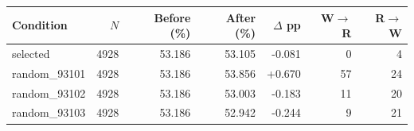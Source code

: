 \begin{tabular}{lrrrrrr}
\hline
Condition & $N$ & Before (\%) & After (\%) & $\Delta$ pp & W$\to$R & R$\to$W \\
\hline
selected & 4928 & 53.186 & 53.105 & -0.081 & 0 & 4 \\
random\_93101 & 4928 & 53.186 & 53.856 & +0.670 & 57 & 24 \\
random\_93102 & 4928 & 53.186 & 53.003 & -0.183 & 11 & 20 \\
random\_93103 & 4928 & 53.186 & 52.942 & -0.244 & 9 & 21 \\
\hline
\end{tabular}
